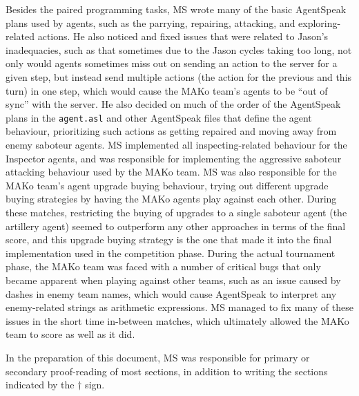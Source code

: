 Besides the paired programming tasks, MS wrote many of the basic AgentSpeak plans used by agents, such as the parrying, repairing, attacking, and exploring-related actions.
He also noticed and fixed issues that were related to Jason's inadequacies, such as that sometimes due to the Jason cycles taking too long, not only would agents sometimes miss out on sending an action to the server for a given step, but instead send multiple actions (the action for the previous and this turn) in one step, which would cause the MAKo team's agents to be \enquote{out of sync} with the server.
He also decided on much of the order of the AgentSpeak plans in the \texttt{agent.asl} and other AgentSpeak files that define the agent behaviour, prioritizing such actions as getting repaired and moving away from enemy saboteur agents.
MS implemented all inspecting-related behaviour for the Inspector agents, and was responsible for implementing the aggressive saboteur attacking behaviour used by the MAKo team.
MS was also responsible for the MAKo team's agent upgrade buying behaviour, trying out different upgrade buying strategies by having the MAKo agents play against each other.
During these matches, restricting the buying of upgrades to a single saboteur agent (the artillery agent) seemed to outperform any other approaches in terms of the final score, and this upgrade buying strategy is the one that made it into the final implementation used in the competition phase.
During the actual tournament phase, the MAKo team was faced with a number of critical bugs that only became apparent when playing against other teams, such as an issue caused by dashes in enemy team names, which would cause AgentSpeak to interpret any enemy-related strings as arithmetic expressions.
MS managed to fix many of these issues in the short time in-between matches, which ultimately allowed the MAKo team to score as well as it did.

In the preparation of this document, MS was responsible for primary or secondary proof-reading of most sections, in addition to writing the sections indicated by the $\dagger$ sign.
